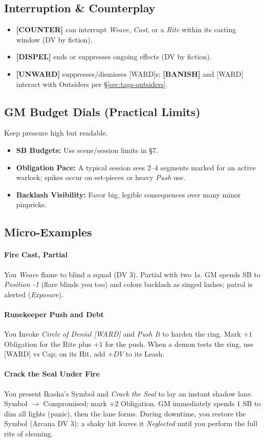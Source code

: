 \subsection{Interruption \& Counterplay}
\begin{itemize}
  \item \textbf{[COUNTER]} can interrupt \emph{Weave}, \emph{Cast}, or a \emph{Rite} within its casting window (DV by fiction).
  \item \textbf{[DISPEL]} ends or suppresses ongoing effects (DV by fiction).
  \item \textbf{[UNWARD]} suppresses/dismisses [WARD]s; \textbf{[BANISH]} and [WARD] interact with Outsiders per \S\ref{sec:tags-outsiders}.
\end{itemize}

\subsection{GM Budget Dials (Practical Limits)}
Keep pressure high but readable.
\begin{itemize}
  \item \textbf{SB Budgets:} Use scene/session limits in \S7.
  \item \textbf{Obligation Pace:} A typical session sees 2--4 segments marked for an active warlock; spikes occur on set-pieces or heavy \emph{Push} use.
  \item \textbf{Backlash Visibility:} Favor big, legible consequences over many minor pinpricks.
\end{itemize}

\subsection{Micro-Examples}
\paragraph{Fire Cast, Partial}
You \emph{Weave} flame to blind a squad (DV 3). Partial with two 1s. GM spends SB to \emph{Position -1} (flare blinds you too) and colors backlash as singed lashes; patrol is alerted (\emph{Exposure}).

\paragraph{Runekeeper Push and Debt}
You Invoke \emph{Circle of Denial [WARD]} and \emph{Push It} to harden the ring. Mark $+1$ Obligation for the Rite plus $+1$ for the push. When a demon tests the ring, use [WARD] vs Cap; on its Hit, add $+DV$ to its Leash.

\paragraph{Crack the Seal Under Fire}
You present Ikasha’s Symbol and \emph{Crack the Seal} to lay an instant shadow lane. Symbol $\rightarrow$ Compromised; mark $+2$ Obligation. GM immediately spends 1 SB to dim all lights (panic), then the lane forms. During downtime, you restore the Symbol (Arcana DV 3): a shaky hit leaves it \emph{Neglected} until you perform the full rite of cleaning.
